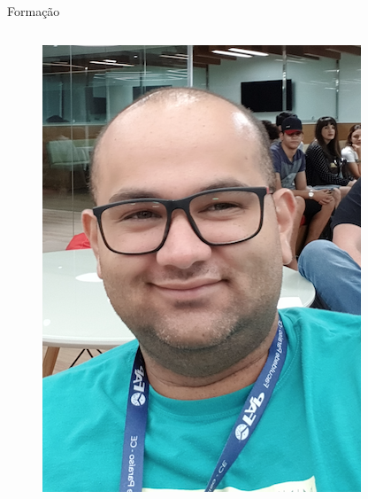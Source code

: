 \documentclass{beamer}
\begin{document}
\begin{frame}{Formação}
\begin{columns}[T]
\begin{column}{.35\textwidth}
\begin{figure}[t!]
                \includegraphics[scale=0.4]{face.png}
                \label{fig:me1}
            \end{figure}
        \end{column}%
    \end{columns}
\end{frame}
\end{document}
